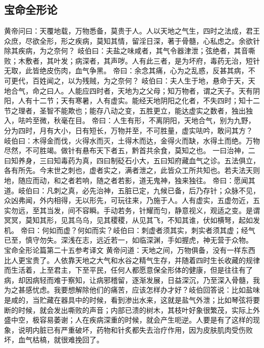 \documentclass[a4paper,12pt,UTF8,twoside]{ctexbook}
\begin{document}
\part{}
\chapter{宝命全形论}

黄帝问曰：天覆地载，万物悉备，莫贵于人。人以天地之气生，四时之法成，君王众庶，尽欲全形，形之疾病，莫知其情，留淫日深，著于骨髓，心私虑之。余欲针除其疾病，为之奈何？
岐伯曰：夫盐之味咸者，其气令器津泄；弦绝者，其音嘶败；木敷者，其叶发；病深者，其声哕。人有此三者，是为坏府，毒药无治，短针无取，此皆绝皮伤肉，血气争黑。
帝曰：余念其痛，心为之乱惑，反甚其病，不可更代，百姓闻之，以为残贼，为之奈何？
岐伯曰：夫人生于地，悬命于天，天地合气，命之曰人。人能应四时者，天地为之父母；知万物者，谓之天子。天有阴阳，人有十二节；天有寒暑，人有虚实。能经天地阴阳之化者，不失四时；知十二节之理者，圣智不能欺也；能存八动之变，五胜更立，能达虚实之数者，独出独入，呿吟至微，秋毫在目。
帝曰：人生有形，不离阴阳，天地合气，别为九野，分为四时，月有大小，日有短长，万物并至，不可胜量，虚实呿吟，敢问其方？
岐伯曰：木得金而伐，火得水而灭，土得木而达，金得火而缺，水得土而绝。万物尽然，不可胜竭。做针有悬布天下者五，黔首共余食，莫知之也。
一曰治神，二曰知养身，三曰知毒药为真，四曰制砭石小大，五曰知府藏血气之诊。五法俱立，各有所先。今末世之刺也，虚者实之，满者泄之，此皆众工所共知也。若夫法天则地，随应而动，和之者若响，随之者若影，道无鬼神，独来独往。
帝曰：愿闻其道。岐伯曰：凡刺之真，必先治神，五脏已定，九候已备，后乃存针；众脉不见，众凶弗闻，外内相得，无以形先，可玩往来，乃施于人。人有虚实，五虚勿近，五实勿远，至其当发，间不容瞬。手动若务，针耀而匀，静意视义，观适之变。是谓冥冥，莫知其形，见其乌乌，见其稷稷，从见其飞，不知其谁，伏如横弩，起如发机。
帝曰：何如而虚？何如而实？岐伯曰：刺虚者须其实，刺实者须其虚；经气已至，慎守勿失。深浅在志，远近若一，如临深渊，手如握虎，神无营于众物。
宝命全形论篇第二十五参考译文
黄帝问道：天地之间，万物俱备，没有一样东西比人更宝贵了。人依靠天地之大气和水谷之精气生存，并随着四时生长收藏的规律而生活着，上至君主，下至平民，任何人都愿意保全形体的健康，但是往往有了病，却因病轻而难于察知，让病邪稽留，逐渐发展，日益深沉，乃至深入骨髓，我为之甚感忧虑。我要想解除他们的痛苦，应该怎样办才好？岐伯回答说：比如盐味是咸的，当贮藏在器具中的时候，看到渗出水来，这就是盐气外泄；比如琴弦将要断的时候，就会发出嘶败的声音；内部已溃的树木，其枝叶好象很繁茂，实际上外盛中空，极容易萎谢；人在疾病深重的时候，就会产生呃逆。人要是有了这样的现象，说明内脏已有严重破坏，药物和针炙都失去治疗作用，因为皮肤肌肉受伤败坏，血气枯槁，就很难挽回了。
\end{document}
